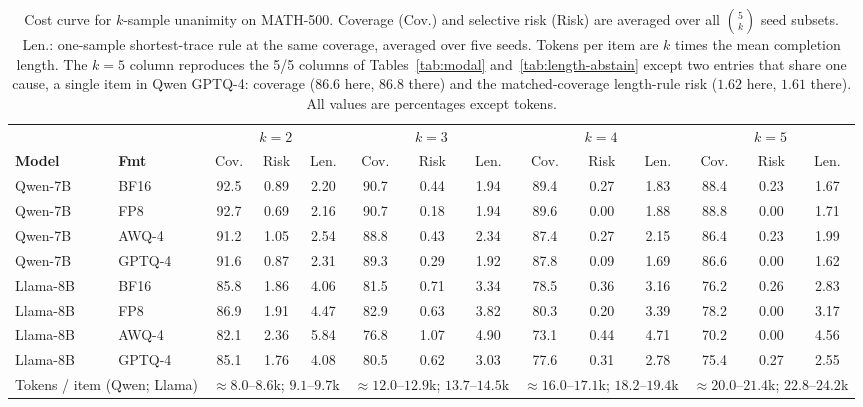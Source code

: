 \documentclass[11pt,a4paper]{article}
\begin{document}
\begin{table}
\centering
\caption{Cost curve for $k$-sample unanimity on MATH-500. Coverage (Cov.) and selective risk (Risk) are averaged over all $\binom{5}{k}$ seed subsets. Len.: one-sample shortest-trace rule at the same coverage, averaged over five seeds. Tokens per item are $k$ times the mean completion length. The $k=5$ column reproduces the 5/5 columns of Tables~\ref{tab:modal} and~\ref{tab:length-abstain} except two entries that share one cause, a single item in Qwen GPTQ-4: coverage ($86.6$ here, $86.8$ there) and the matched-coverage length-rule risk ($1.62$ here, $1.61$ there). All values are percentages except tokens.}
\label{tab:kcurve}
\small
\begin{tabular}{llcccccccccccc}
\toprule
 & & \multicolumn{3}{c}{$k=2$} & \multicolumn{3}{c}{$k=3$} & \multicolumn{3}{c}{$k=4$} & \multicolumn{3}{c}{$k=5$} \\
\cmidrule(lr){3-5}\cmidrule(lr){6-8}\cmidrule(lr){9-11}\cmidrule(lr){12-14}
\textbf{Model} & \textbf{Fmt} & Cov. & Risk & Len. & Cov. & Risk & Len. & Cov. & Risk & Len. & Cov. & Risk & Len. \\
\midrule
Qwen-7B & BF16   & 92.5 & 0.89 & 2.20 & 90.7 & 0.44 & 1.94 & 89.4 & 0.27 & 1.83 & 88.4 & 0.23 & 1.67 \\
Qwen-7B & FP8    & 92.7 & 0.69 & 2.16 & 90.7 & 0.18 & 1.94 & 89.6 & 0.00 & 1.88 & 88.8 & 0.00 & 1.71 \\
Qwen-7B & AWQ-4  & 91.2 & 1.05 & 2.54 & 88.8 & 0.43 & 2.34 & 87.4 & 0.27 & 2.15 & 86.4 & 0.23 & 1.99 \\
Qwen-7B & GPTQ-4 & 91.6 & 0.87 & 2.31 & 89.3 & 0.29 & 1.92 & 87.8 & 0.09 & 1.69 & 86.6 & 0.00 & 1.62 \\
\midrule
Llama-8B & BF16   & 85.8 & 1.86 & 4.06 & 81.5 & 0.71 & 3.34 & 78.5 & 0.36 & 3.16 & 76.2 & 0.26 & 2.83 \\
Llama-8B & FP8    & 86.9 & 1.91 & 4.47 & 82.9 & 0.63 & 3.82 & 80.3 & 0.20 & 3.39 & 78.2 & 0.00 & 3.17 \\
Llama-8B & AWQ-4  & 82.1 & 2.36 & 5.84 & 76.8 & 1.07 & 4.90 & 73.1 & 0.44 & 4.71 & 70.2 & 0.00 & 4.56 \\
Llama-8B & GPTQ-4 & 85.1 & 1.76 & 4.08 & 80.5 & 0.62 & 3.03 & 77.6 & 0.31 & 2.78 & 75.4 & 0.27 & 2.55 \\
\midrule
\multicolumn{2}{l}{Tokens / item (Qwen; Llama)} & \multicolumn{3}{c}{$\approx 8.0$--$8.6$k; $9.1$--$9.7$k} & \multicolumn{3}{c}{$\approx 12.0$--$12.9$k; $13.7$--$14.5$k} & \multicolumn{3}{c}{$\approx 16.0$--$17.1$k; $18.2$--$19.4$k} & \multicolumn{3}{c}{$\approx 20.0$--$21.4$k; $22.8$--$24.2$k} \\
\bottomrule
\end{tabular}
\end{table}
\end{document}

